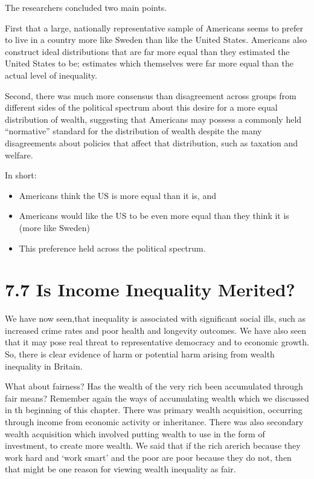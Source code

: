 \documentclass[]{tufte-handout}
\providecommand{\tightlist}{%
  \setlength{\itemsep}{0pt}\setlength{\parskip}{0pt}}
\begin{document}
The researchers concluded two main points.

First that a large, nationally representative sample of Americans seems
to prefer to live in a country more like Sweden than like the United
States. Americans also construct ideal distributions that are far more
equal than they estimated the United States to be; estimates which
themselves were far more equal than the actual level of inequality.

Second, there was much more consensus than disagreement across groups
from different sides of the political spectrum about this desire for a
more equal distribution of wealth, suggesting that Americans may possess
a commonly held ``normative'' standard for the distribution of wealth
despite the many disagreements about policies that affect that
distribution, such as taxation and welfare.

In short:

\begin{itemize}
\tightlist
\item
  Americans think the US is more equal than it is, and
\item
  Americans would like the US to be even more equal than they think it
  is (more like Sweden)
\item
  This preference held across the political spectrum.
\end{itemize}

\hypertarget{is-income-inequality-merited}{%
\section{7.7 Is Income Inequality
Merited?}\label{is-income-inequality-merited}}

We have now seen,that inequality is associated with significant social
ills, such as increased crime rates and poor health and longevity
outcomes. We have also seen that it may pose real threat to
representative democracy and to economic growth. So, there is clear
evidence of harm or potential harm arising from wealth inequality in
Britain.

What about fairness? Has the wealth of the very rich been accumulated
through fair means? Remember again the ways of accumulating wealth which
we discussed in th beginning of this chapter. There was primary wealth
acquisition, occurring through income from economic activity or
inheritance. There was also secondary wealth acquisition which involved
putting wealth to use in the form of investment, to create more wealth.
We said that if the rich arerich because they work hard and `work smart'
and the poor are poor because they do not, then that might be one reason
for viewing wealth inequality as fair.
\end{document}
